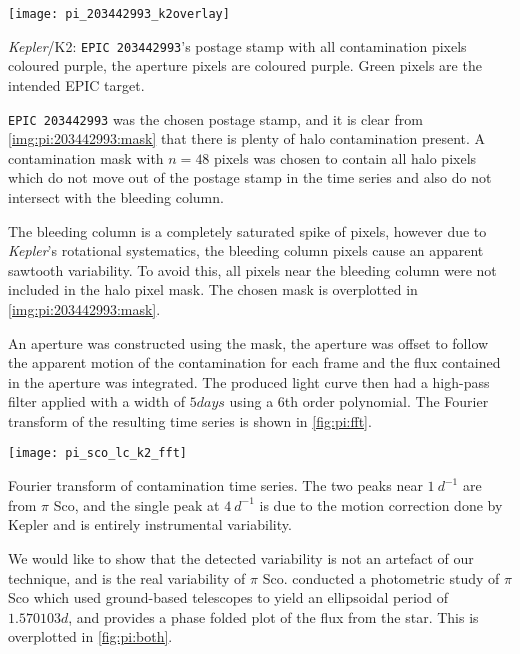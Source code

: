 \documentclass{book}
\begin{document}
\begin{staticfigure}
	\centering
		\texttt{[image: pi\_203442993\_k2overlay]}
	\caption{\textit{Kepler}/K2: \texttt{EPIC 203442993}'s postage stamp with
			 all contamination pixels coloured purple, the aperture pixels are
			 coloured purple. Green pixels are the intended EPIC target.}
	\label{img:pi:203442993:mask}
\end{staticfigure}

\texttt{EPIC 203442993} was the chosen postage stamp, and it is clear from
\autoref{img:pi:203442993:mask} that there is plenty of halo contamination present.
A contamination mask with $n = 48$ pixels was chosen to contain all halo pixels
which do not move out of the postage stamp in the time series and also do not
intersect with the bleeding column.

The bleeding column is a completely saturated spike of pixels, however due to
\textit{Kepler}'s rotational systematics, the bleeding column pixels cause an
apparent sawtooth variability. To avoid this, all pixels near the bleeding
column were not included in the halo pixel mask. The chosen mask is overplotted
in \autoref{img:pi:203442993:mask}.

An aperture was constructed using the mask, the aperture was offset to follow
the apparent motion of the contamination for each frame and the flux contained
in the aperture was integrated. The produced light curve then had a high-pass
filter applied with a width of $5 days$ using a $6$th order polynomial. The
Fourier transform of the resulting time series is shown in \autoref{fig:pi:fft}.

\begin{staticfigure}
	\centering
		\texttt{[image: pi\_sco\_lc\_k2\_fft]}
	\caption{Fourier transform of contamination time series. The two peaks near
			 $1~d^{-1}$ are from $\pi$ Sco, and the single peak at $4~d^{-1}$ is
			 due to the motion correction done by Kepler and is entirely
			 instrumental variability.}
	\label{fig:pi:fft}
\end{staticfigure}

We would like to show that the detected variability is not an artefact of our
technique, and is the real variability of $\pi$ Sco. \citet{2005JAD....11....7S}
conducted a photometric study of $\pi$ Sco which used ground-based telescopes
to yield an ellipsoidal period of $1.570103 d$, and provides a phase folded plot
of the flux from the star. This is overplotted in \autoref{fig:pi:both}.
\end{document}
